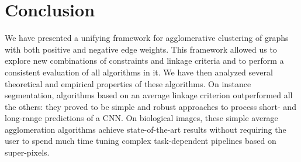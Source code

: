 \section{Conclusion}
We have presented a unifying framework for agglomerative clustering of graphs with both positive and negative edge weights. This framework allowed us to explore new combinations of constraints and linkage criteria and to perform a consistent evaluation of all algorithms in it. 
We have then analyzed several theoretical and empirical properties of these algorithms. On instance segmentation, algorithms based on an average linkage criterion outperformed all the others: they proved to be simple and robust approaches to process short- and long-range predictions of a CNN.
On biological images, these simple average agglomeration algorithms achieve state-of-the-art results without requiring the user to spend much time tuning complex task-dependent pipelines based on super-pixels.
